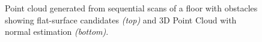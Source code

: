 			\begin{figure}[!h]
				\centering
				\caption{Point cloud generated from sequential scans of a floor with obstacles showing flat-surface candidates \emph{(top)} and 3D Point Cloud with normal estimation \emph{(bottom)}.}
				\label{fig::surface_estimation}
			\end{figure}
